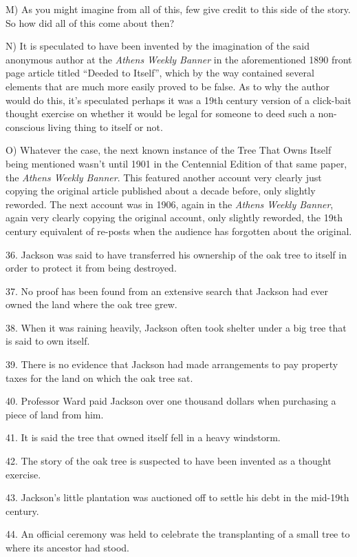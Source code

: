 \documentclass[UTF8,11pt]{ctexart}
\begin{document}
M) As you might imagine from all of this, few give credit to this side of the story. So how did all of this come about then?


N) It is speculated to have been invented by the imagination of the said anonymous author at the \textit{Athens Weekly Banner} in the aforementioned 1890 front page article titled “Deeded to Itself”, which by the way contained several elements that are much more easily proved to be false. As to why the author would do this, it’s speculated perhaps it was a 19th century version of a click-bait thought exercise on whether it would be legal for someone to deed such a non-conscious living thing to itself or not.


O) Whatever the case, the next known instance of the Tree That Owns Itself being mentioned wasn’t until 1901 in the Centennial Edition of that same paper, the \textit{Athens Weekly Banner}. This featured another account very clearly just copying the original article published about a decade before, only slightly reworded. The next account was in 1906, again in the \textit{Athens Weekly Banner}, again very clearly copying the original account, only slightly reworded, the 19th century equivalent of re-posts when the audience has forgotten about the original.


36. Jackson was said to have transferred his ownership of the oak tree to itself in order to protect it from being destroyed.


37. No proof has been found from an extensive search that Jackson had ever owned the land where the oak tree grew.


38. When it was raining heavily, Jackson often took shelter under a big tree that is said to own itself.


39. There is no evidence that Jackson had made arrangements to pay property taxes for the land on which the oak tree sat.


40. Professor Ward paid Jackson over one thousand dollars when purchasing a piece of land from him.


41. It is said the tree that owned itself fell in a heavy windstorm.


42. The story of the oak tree is suspected to have been invented as a thought exercise.


43. Jackson’s little plantation was auctioned off to settle his debt in the mid-19th century.


44. An official ceremony was held to celebrate the transplanting of a small tree to where its ancestor had stood.
\end{document}
